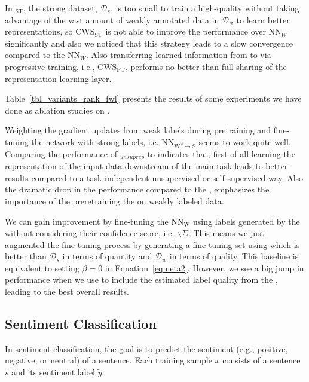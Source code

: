 In \cws$_\text{ST}$,  the strong dataset, $\mathcal{D}_s$, is too small to train a high-quality \cnet without taking advantage of the vast amount of weakly annotated data in $\mathcal{D}_w$ to learn better representations, so CWS$_\text{ST}$ is not able to improve the performance over $\text{NN}_W$ significantly and also we noticed that this strategy leads to a slow convergence compared to the $\text{NN}_W$. 
Also transferring learned information from \tnet to \cnet via progressive training, i.e., CWS$_\text{PT}$, performs no better than full sharing of the representation learning layer.




Table~\ref{tbl_variants_rank_fwl} presents the results of some experiments we have done as ablation studies on \fwl. 

Weighting the gradient updates from weak labels during pretraining and fine-tuning the network with strong labels, i.e. NN$_{\text{W}^\omega \to \text{S}}$ seems to work quite well.
%
Comparing the performance of \fwlnospace$_{unsuprep}$ to \fwl indicates that, first of all learning the representation of the input data downstream of the main task leads to better results compared to a task-independent unsupervised or self-supervised way. Also the dramatic drop in the performance compared to the \fwl, emphasizes the importance of the preretraining the \std on weakly labeled data.

%
We can gain improvement by fine-tuning the NN$_\text{W}$ using labels generated by the \tch without considering their confidence score, i.e. \fwl$\backslash\Sigma$. This means we just augmented the fine-tuning process by generating a fine-tuning set using \tch which is better than $\mathcal{D}_s$ in terms of quantity and $\mathcal{D}_w$ in terms of quality. This baseline is equivalent to setting $\beta = 0$ in Equation~\ref{eqn:eta2}. However, we see a big jump in performance when we use \fwl to include the estimated label quality from the \tch, leading to the best overall results.

\subsection{Sentiment Classification}
In sentiment classification, the goal is to predict the sentiment (e.g., positive, negative, or neutral) of a sentence. Each training sample $x$ consists of a sentence $s$ and its sentiment label $\tilde{y}$.

